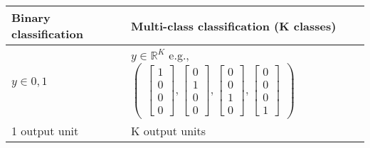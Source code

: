 \begin{center}
\begin{tabular}{| l | l | l |}
\hline
Binary classification & Multi-class classification (K classes)\\
\hline
$y \in {0,1}$  &
$y \in \mathbb{R}^K$ e.g., $\begin{pmatrix}
\begin{bmatrix} 1\\ 0\\ 0\\ 0\end{bmatrix}, \begin{bmatrix} 0\\ 1\\ 0\\ 0\end{bmatrix}, \begin{bmatrix} 0\\ 0\\ 1\\ 0\end{bmatrix}, \begin{bmatrix} 0\\ 0\\ 0\\ 1\end{bmatrix}
\end{pmatrix}$ \\
1 output unit & K output units\\
\hline
\end{tabular}
\end{center}

